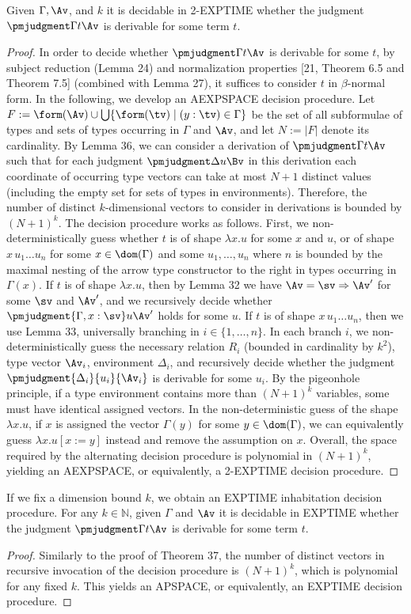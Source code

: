  Given $\Gamma,\Av$, and $k$ it is decidable in 2-EXPTIME whether the judgment $\pmjudgment\Gamma t\Av$ is derivable for some term $t$.
\begin{proof}
In order to decide whether $\pmjudgment\Gamma t\Av$ is derivable for some $t$, by subject reduction (Lemma 24) and normalization properties [21, Theorem 6.5 and Theorem 7.5] (combined with Lemma 27), it suffices to consider $t$ in $\beta$-normal form. In the following, we develop an AEXPSPACE decision procedure.
Let $F:=\form(\Av)\cup\bigcup\{\form(\tv)\mid(y:\tv)\in\Gamma\}$ be the set of all subformulae of types and sets of types occurring in $\Gamma$ and $\Av$, and let $N:=|F|$ denote its cardinality. By Lemma 36, we can consider a derivation of $\pmjudgment\Gamma t\Av$ such that for each judgment $\pmjudgment\Delta u\Bv$ in this derivation each coordinate of occurring type vectors can take at most $N+1$ distinct values (including the empty set for sets of types in environments). Therefore, the number of distinct $k$-dimensional vectors to consider in derivations is bounded by $(N+1)^k$.
The decision procedure works as follows. First, we non-deterministically guess whether $t$ is of shape $\lambda x.u$ for some $x$ and $u$, or of shape $x\,u_1\ldots u_n$ for some $x\in\dom(\Gamma)$ and some $u_1,\ldots,u_n$ where $n$ is bounded by the maximal nesting of the arrow type constructor to the right in types occurring in $\Gamma(x)$.
If $t$ is of shape $\lambda x.u$, then by Lemma 32 we have $\Av=\sv\Rightarrow\Av'$ for some $\sv$ and $\Av'$, and we recursively decide whether $\pmjudgment{\Gamma,x:\sv}u{\Av'}$ holds for some $u$.
If $t$ is of shape $x\,u_1\ldots u_n$, then we use Lemma 33, universally branching in $i\in\{1,\ldots,n\}$. In each branch $i$, we non-deterministically guess the necessary relation $R_i$ (bounded in cardinality by $k^2$), type vector $\Av_i$, environment $\Delta_i$, and recursively decide whether the judgment $\pmjudgment{\Delta_i}{u_i}{\Av_i}$ is derivable for some $u_i$.
By the pigeonhole principle, if a type environment contains more than $(N+1)^k$ variables, some must have identical assigned vectors. In the non-deterministic guess of the shape $\lambda x.u$, if $x$ is assigned the vector $\Gamma(y)$ for some $y\in\dom(\Gamma)$, we can equivalently guess $\lambda x.u[x:=y]$ instead and remove the assumption on $x$.
Overall, the space required by the alternating decision procedure is polynomial in $(N+1)^k$, yielding an AEXPSPACE, or equivalently, a 2-EXPTIME decision procedure.
\end{proof}
If we fix a dimension bound $k$, we obtain an EXPTIME inhabitation decision procedure.
 For any $k\in\mathbb N$, given $\Gamma$ and $\Av$ it is decidable in EXPTIME whether the judgment $\pmjudgment\Gamma t\Av$ is derivable for some term $t$.
\begin{proof}
Similarly to the proof of Theorem 37, the number of distinct vectors in recursive invocation of the decision procedure is $(N+1)^k$, which is polynomial for any fixed $k$. This yields an APSPACE, or equivalently, an EXPTIME decision procedure.
\end{proof}
